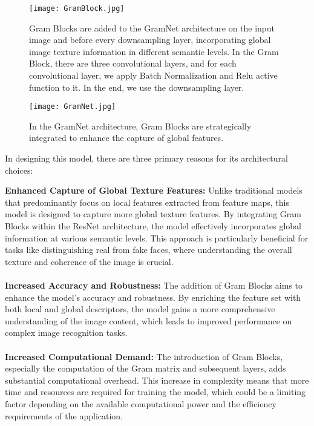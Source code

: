 \documentclass[rebuttal]{cvpr}
\begin{document}
\begin{figure}[t]
\begin{center}
   \texttt{[image: GramBlock.jpg]}
\end{center}
   \caption{Gram Blocks are added to the GramNet architecture on the input image and before every downsampling layer, incorporating global image texture information in different semantic levels. In the Gram Block, there are three convolutional layers, and for each convolutional layer, we apply Batch Normalization and Relu active function to it. In the end, we use the downsampling layer.}
\label{fig:long}
\label{fig:onecol}
\end{figure}

\begin{figure*}[t]
\begin{center}
   \texttt{[image: GramNet.jpg]}
\end{center}
   \caption{In the GramNet architecture, Gram Blocks are strategically integrated to enhance the capture of global features.}
\label{fig:long}
\label{fig:onecol}
\end{figure*}

In designing this model, there are three primary reasons for its architectural choices:  

\textbf{Enhanced Capture of Global Texture Features:} Unlike traditional models that predominantly focus on local features extracted from feature maps, this model is designed to capture more global texture features. By integrating Gram Blocks within the ResNet architecture, the model effectively incorporates global information at various semantic levels. This approach is particularly beneficial for tasks like distinguishing real from fake faces, where understanding the overall texture and coherence of the image is crucial.
\\
\\
\textbf{Increased Accuracy and Robustness:} The addition of Gram Blocks aims to enhance the model's accuracy and robustness. By enriching the feature set with both local and global descriptors, the model gains a more comprehensive understanding of the image content, which leads to improved performance on complex image recognition tasks.
\\
\\
\textbf{Increased Computational Demand:} The introduction of Gram Blocks, especially the computation of the Gram matrix and subsequent layers, adds substantial computational overhead. This increase in complexity means that more time and resources are required for training the model, which could be a limiting factor depending on the available computational power and the efficiency requirements of the application.
\end{document}
